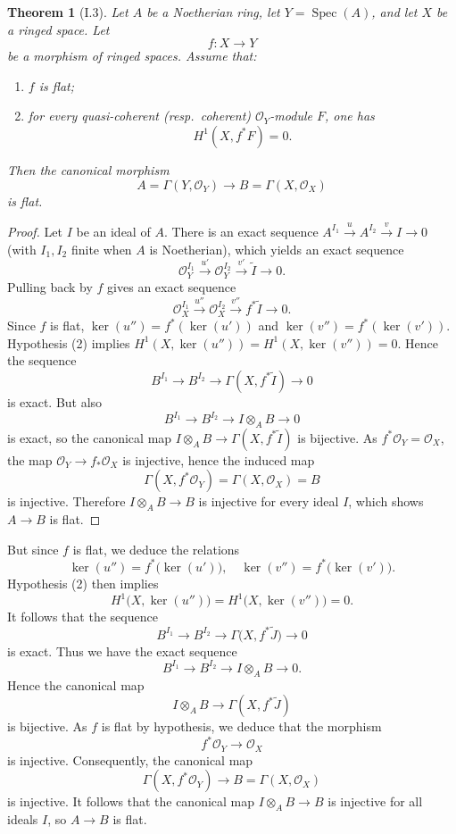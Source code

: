 \documentclass[a4paper]{amsart}
\newtheorem{theorem}{Theorem}[section]
\theoremstyle{definition}
\theoremstyle{definition}
\begin{document}
\begin{theorem}[I.3]
Let $A$ be a Noetherian ring, let $Y=\operatorname{Spec}(A)$, and let $X$ be a ringed space. Let
\[
f:X \to Y
\]
be a morphism of ringed spaces. Assume that:
\begin{enumerate}
\item $f$ is flat;
\item for every quasi-coherent (resp.\ coherent) $\mathcal O_Y$-module $F$, one has
\[
H^1(X,f^*F)=0.
\]
\end{enumerate}
Then the canonical morphism
\[
A=\Gamma(Y,\mathcal O_Y)\longrightarrow B=\Gamma(X,\mathcal O_X)
\]
is flat.
\end{theorem}

\begin{proof}
Let $I$ be an ideal of $A$. There is an exact sequence $A^{I_1}\xrightarrow{u}A^{I_2}\xrightarrow{v} I\to 0$ (with $I_1,I_2$ finite when $A$ is Noetherian), which yields an exact sequence
\[
\mathcal O_Y^{I_1}\xrightarrow{u'}\mathcal O_Y^{I_2}\xrightarrow{v'} \widetilde I\to 0.
\]
Pulling back by $f$ gives an exact sequence
\[
\mathcal O_X^{I_1}\xrightarrow{u''}\mathcal O_X^{I_2}\xrightarrow{v''} f^*\widetilde I\to 0.
\]
Since $f$ is flat, $\ker(u'')=f^*(\ker(u'))$ and $\ker(v'')=f^*(\ker(v'))$.  
Hypothesis (2) implies $H^1(X,\ker(u''))=H^1(X,\ker(v''))=0$. Hence the sequence
\[
B^{I_1}\longrightarrow B^{I_2}\longrightarrow \Gamma(X,f^*\widetilde I)\longrightarrow 0
\]
is exact. But also
\[
B^{I_1}\longrightarrow B^{I_2}\longrightarrow I\otimes_A B\longrightarrow 0
\]
is exact, so the canonical map $I\otimes_A B\to \Gamma(X,f^*\widetilde I)$ is bijective. As $f^*\mathcal O_Y=\mathcal O_X$, the map $\mathcal O_Y\to f_*\mathcal O_X$ is injective, hence the induced map
\[
\Gamma(X,f^*\mathcal O_Y)=\Gamma(X,\mathcal O_X)=B
\]
is injective. Therefore $I\otimes_A B\to B$ is injective for every ideal $I$, which shows $A\to B$ is flat.
\end{proof}

But since $f$ is flat, we deduce the relations
\[
\ker(u'') = f^*\big(\ker(u')\big), \quad \ker(v'') = f^*\big(\ker(v')\big).
\]
Hypothesis (2) then implies
\[
H^1\big(X, \ker(u'')\big) = H^1\big(X, \ker(v'')\big) = 0.
\]
It follows that the sequence
\[
B^{I_1} \longrightarrow B^{I_2} \longrightarrow \Gamma\big(X, f^*\widetilde{J}\big) \longrightarrow 0
\]
is exact. Thus we have the exact sequence
\[
B^{I_1} \longrightarrow B^{I_2} \longrightarrow I \otimes_A B \longrightarrow 0.
\]
Hence the canonical map
\[
I \otimes_A B \longrightarrow \Gamma(X, f^*\widetilde{J})
\]
is bijective. As $f$ is flat by hypothesis, we deduce that the morphism
\[
f^*\mathcal{O}_Y \longrightarrow \mathcal{O}_X
\]
is injective. Consequently, the canonical map
\[
\Gamma(X, f^*\mathcal{O}_Y) \longrightarrow B = \Gamma(X, \mathcal{O}_X)
\]
is injective. It follows that the canonical map $I \otimes_A B \longrightarrow B$ is injective for all ideals $I$, so $A \longrightarrow B$ is flat.
\end{document}
